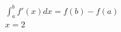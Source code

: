 \documentclass[preview]{standalone}
\begin{document}
\begin{align*}
\int_a^b f'( x ) d x  = f(b)- f(a)\\ x =2
\end{align*}
\end{document}
